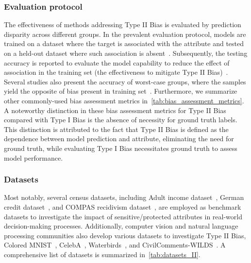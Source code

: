 \subsubsection{Evaluation protocol}
The effectiveness of methods addressing Type II Bias is evaluated by prediction disparity across different groups.
In the prevalent evaluation protocol, models are trained on a dataset where the target is associated with the attribute and tested on a held-out dataset where such association is absent~\cite{learn_not_to_learn_Colored_MNIST, Back_MI, CSAD}.
Subsequently, the testing accuracy is reported to evaluate the model capability to reduce the effect of association in the training set (the effectiveness to mitigate Type II Bias)~\cite{DI}.
Several studies also present the accuracy of worst-case groups, where the samples yield the opposite of bias present in training set~\cite{Group_DRO, JTT, confused_dataset_bias_DFA}.
Furthermore, we summarize other commonly-used bias assessment metrics in~\cref{tab:bias_assessment_metrics}.
A noteworthy distinction in these bias assessment metrics for Type II Bias compared with Type I Bias is the absence of necessity for ground truth labels. This distinction is attributed to the fact that Type II Bias is defined as the dependence between model prediction and attribute, eliminating the need for ground truth, while evaluating Type I Bias necessitates ground truth to assess model performance.






\subsubsection{Datasets}
Most notably, several census datasets, including Adult income dataset~\cite{adult_dataset_and_german_dataset}, German credit dataset~\cite{adult_dataset_and_german_dataset}, and COMPAS recidivism dataset~\cite{COMPAS}, are employed as benchmark datasets to investigate the impact of sensitive/protected attributes in real-world decision-making processes. 
Additionally, computer vision and natural language processing communities also develop various datasets to investigate Type II Bias, \eg Colored MNIST~\cite{learn_not_to_learn_Colored_MNIST}, CelebA~\cite{CelebA,LfF_CelebA_Bias_conflicting}, Waterbirds~\cite{Group_DRO}, and CivilComments-WILDS~\cite{CivilComments,Wilds}.
A comprehensive list of datasets is summarized in~\cref{tab:datasets_II}.







